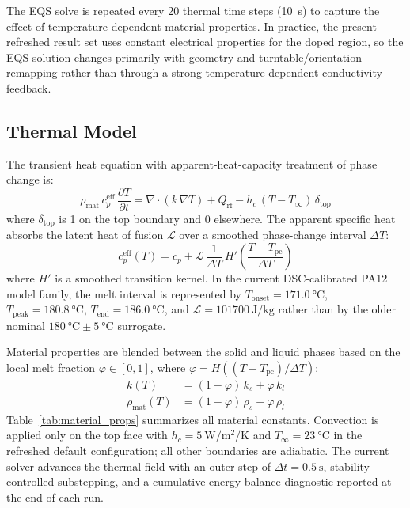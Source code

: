\documentclass[5p,times]{elsarticle}
\newcommand{\Qrf}{Q_{\mathrm{rf}}}
\newcommand{\Tpc}{T_{\mathrm{pc}}}
\newcommand{\phimelt}{\varphi}
\begin{document}
The EQS solve is repeated every 20 thermal time steps (\SI{10}{\second})
to capture the effect of temperature-dependent material properties.
In practice, the present refreshed result set uses constant electrical
properties for the doped region, so the EQS solution changes primarily
with geometry and turntable/orientation remapping rather than through a
strong temperature-dependent conductivity feedback.

\subsection{Thermal Model}
\label{sec:thermal_model}

The transient heat equation with apparent-heat-capacity treatment of
phase change is:
\begin{equation}
  \rho_{\mathrm{mat}}\,c_p^{\mathrm{eff}}\,\frac{\partial T}{\partial t}
  = \nabla\cdot(k\,\nabla T) + \Qrf - h_c\,(T - T_\infty)\,\delta_{\mathrm{top}}
  \label{eq:heat_eqn}
\end{equation}
where $\delta_{\mathrm{top}}$ is 1 on the top boundary and 0
elsewhere.  The apparent specific heat absorbs the latent heat of
fusion $\mathcal{L}$ over a smoothed phase-change interval $\Delta T$:
\begin{equation}
  c_p^{\mathrm{eff}}(T) = c_p + \mathcal{L}\,
  \frac{1}{\Delta T}\,H'\!\left(\frac{T - \Tpc}{\Delta T}\right)
  \label{eq:apparent_cp}
\end{equation}
where $H'$ is a smoothed transition kernel.  In the current
DSC-calibrated PA12 model family, the melt interval is represented by
$T_{\mathrm{onset}} = \SI{171.0}{\celsius}$,
$T_{\mathrm{peak}} = \SI{180.8}{\celsius}$,
$T_{\mathrm{end}} = \SI{186.0}{\celsius}$, and
$\mathcal{L} = \SI{101700}{\joule\per\kilogram}$ rather than by the
older nominal $\SI{180}{\celsius}\pm\SI{5}{\celsius}$ surrogate.

Material properties are blended between the solid and liquid phases
based on the local melt fraction $\phimelt \in [0, 1]$, where
$\phimelt = H((T - \Tpc)/\Delta T)$:
\begin{align}
  k(T) &= (1-\phimelt)\,k_s + \phimelt\,k_l \\
  \rho_{\mathrm{mat}}(T) &= (1-\phimelt)\,\rho_s + \phimelt\,\rho_l
\end{align}
Table~\ref{tab:material_props} summarizes all material constants.
Convection is applied only on the top face with $h_c =
\SI{5}{\watt\per\meter\squared\per\kelvin}$ and
$T_\infty = \SI{23}{\celsius}$ in the refreshed default configuration;
all other boundaries are adiabatic.  The current solver advances the
thermal field with an outer step of $\Delta t = \SI{0.5}{\second}$,
stability-controlled substepping, and a cumulative energy-balance
diagnostic reported at the end of each run.
\end{document}
